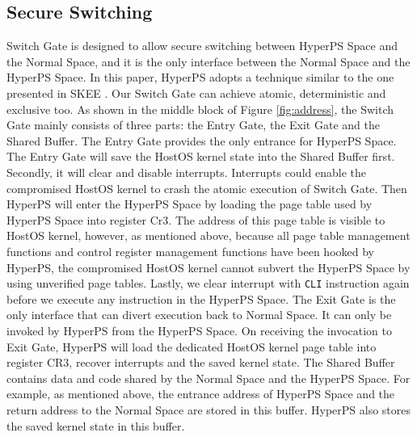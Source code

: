 \subsection{Secure Switching}%
\label{sub:secure_switching}


Switch Gate is designed to allow secure switching between HyperPS Space and the Normal Space, and it is the only interface between the Normal Space and the HyperPS Space. In this paper, HyperPS adopts a technique similar to the one presented in SKEE \cite{azab2016skee}. Our Switch Gate can achieve atomic, deterministic and exclusive too.
As shown in the middle block of Figure \ref{fig:address}, the Switch Gate mainly consists of three parts: the Entry Gate, the Exit Gate and the Shared Buffer. 
The Entry Gate provides the only entrance for HyperPS Space. The Entry Gate will save the HostOS kernel state into the Shared Buffer first. Secondly, it will clear and disable interrupts. Interrupts could enable the compromised HostOS kernel to crash the atomic execution of Switch Gate. 
Then HyperPS will enter the HyperPS Space by loading the page table used by HyperPS Space into register Cr3. 
The address of this page table is visible to HostOS kernel, however, as mentioned above, because all page table management functions and control register management functions have been hooked by HyperPS, the compromised HostOS kernel cannot subvert the HyperPS Space by using unverified page tables. 
Lastly, we clear interrupt with \verb|CLI| instruction again before we execute any instruction in the HyperPS Space. 
The Exit Gate is the only interface that can divert execution back to Normal Space. It can only be invoked by HyperPS from the HyperPS Space. 
On receiving the invocation to Exit Gate, 
HyperPS will load the dedicated HostOS kernel page table into register CR3, recover interrupts and the saved kernel state. 
The Shared Buffer contains data and code shared by the Normal Space and the HyperPS Space. For example, as mentioned above, the entrance address of HyperPS Space and the return address to the Normal Space are stored in this buffer. HyperPS also stores the saved kernel state in this buffer. 


